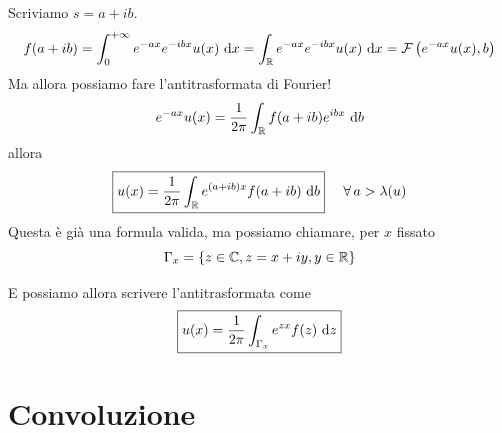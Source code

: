 Scriviamo $s = a + ib$.
\begin{equation*}
f(a + ib) = \int^{+ \infty}_{0} e^{- ax} e^{- ibx} u(x) \  \mathrm{d} x = \int_{\mathbb{R}} e^{- ax} e^{- ibx} u(x) \  \mathrm{d} x = \mathcal{F}\left(e^{- ax} u(x), b\right)
\end{equation*}
Ma allora possiamo fare l'antitrasformata di Fourier!
\begin{equation*}
e^{- ax} u(x) = \frac{1}{2\pi}\int_{\mathbb{R}} f(a + ib) e^{ibx} \  \mathrm{d} b
\end{equation*}
allora
\begin{equation*}
\boxed{u(x) = \frac{1}{2\pi}\int_{\RR} e^{(a + ib) x} f(a + ib) \db} \ \ \ \ \forall a > \lambda (u)
\end{equation*}
Questa è già una formula valida, ma possiamo chiamare, per $x$ fissato
\begin{equation*}
\Gamma_{x} = \{z\in \mathbb{C}, z = x + iy, y\in \mathbb{R}\}
\end{equation*}

\begin{figure}[htpb]
\centering
{} %

\end{figure}
\FloatBarrier

E possiamo allora scrivere l'antitrasformata come
\begin{equation*}
\boxed{u(x) = \frac{1}{2\pi}\int_{\Gamma_{x}} e^{zx} f(z) \  \mathrm{d} z}
\end{equation*}

\section{Convoluzione}

